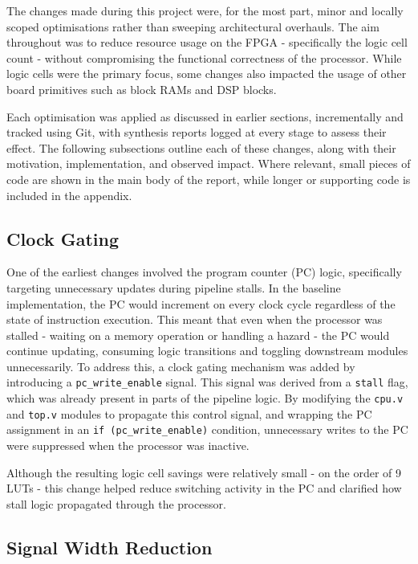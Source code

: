 \documentclass[a4paper,10pt]{article}
\begin{document}
The changes made during this project were, for the most part, 
minor and locally scoped optimisations rather than sweeping architectural overhauls. 
The aim throughout was to reduce resource usage on the FPGA - 
specifically the logic cell count  - 
without compromising the functional correctness of the processor. 
While logic cells were the primary focus, 
some changes also impacted the usage of other board primitives 
such as block RAMs and DSP blocks. 

Each optimisation was applied as discussed in earlier sections,
incrementally and tracked using Git, 
with synthesis reports logged at every stage to assess their effect. 
The following subsections outline each of these changes, 
along with their motivation, implementation, and observed impact. 
Where relevant, small pieces of code are shown in the main body of the report, 
while longer or supporting code is included in the appendix.

\subsection{Clock Gating}
\label{sec:Gating}

One of the earliest changes involved the program counter (PC) logic, 
specifically targeting unnecessary updates during pipeline stalls. 
In the baseline implementation, the PC would increment on every clock cycle 
regardless of the state of instruction execution. 
This meant that even when the processor was stalled - 
waiting on a memory operation or handling a hazard - 
the PC would continue updating, 
consuming logic transitions and toggling downstream modules unnecessarily. 
To address this, a clock gating mechanism was added by 
introducing a \texttt{pc\_write\_enable} signal. 
This signal was derived from a \texttt{stall} flag, 
which was already present in parts of the pipeline logic. 
By modifying the \texttt{cpu.v} and \texttt{top.v} modules 
to propagate this control signal, and wrapping the PC assignment 
in an \texttt{if (pc\_write\_enable)} condition, 
unnecessary writes to the PC were suppressed when the processor was inactive. 

Although the resulting logic cell savings were relatively small - 
on the order of 9 LUTs - this change helped reduce switching activity 
in the PC and clarified how stall logic propagated through the processor. 

\subsection{Signal Width Reduction}
\label{sec:Signal_Width}
\end{document}
